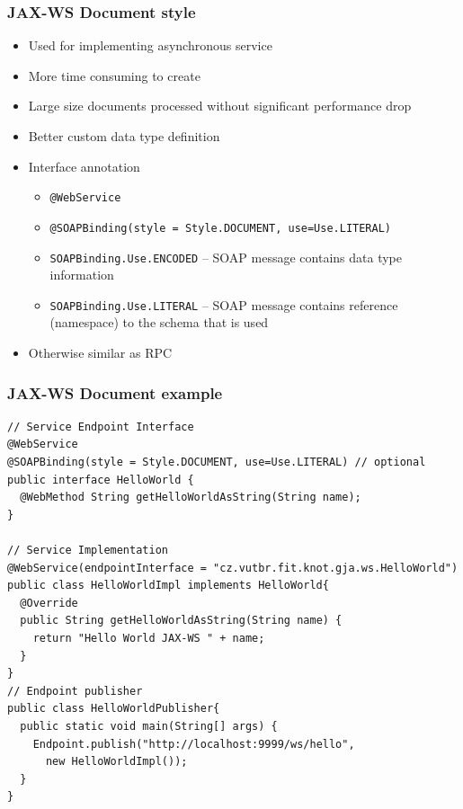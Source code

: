 \documentclass[10pt,xcolor=pdflatex]{beamer}
\begin{document}
\begin{frame}[containsverbatim]\frametitle{JAX-WS Document style}
\begin{itemize}
	\item Used for implementing asynchronous service
	\item More time consuming to create
	\item Large size documents processed without significant performance drop
	\item Better custom data type definition
	\item Interface annotation
      \begin{itemize}
    	\item \texttt{@WebService}
		\item {\footnotesize \texttt{@SOAPBinding(style = Style.DOCUMENT, use=Use.LITERAL)}}
		\item \texttt{SOAPBinding.Use.ENCODED} -- SOAP message contains data type information
		\item \texttt{SOAPBinding.Use.LITERAL} -- SOAP message contains reference (namespace) to the schema that is used
      \end{itemize}
    
    \item Otherwise similar as RPC
\end{itemize}
\end{frame}


\begin{frame}[containsverbatim]\frametitle{JAX-WS Document example}
\begin{footnotesize}
\begin{verbatim}
// Service Endpoint Interface
@WebService
@SOAPBinding(style = Style.DOCUMENT, use=Use.LITERAL) // optional
public interface HelloWorld {
  @WebMethod String getHelloWorldAsString(String name);
}

// Service Implementation
@WebService(endpointInterface = "cz.vutbr.fit.knot.gja.ws.HelloWorld")
public class HelloWorldImpl implements HelloWorld{
  @Override
  public String getHelloWorldAsString(String name) {
    return "Hello World JAX-WS " + name;
  }
}
// Endpoint publisher
public class HelloWorldPublisher{
  public static void main(String[] args) {
    Endpoint.publish("http://localhost:9999/ws/hello", 
      new HelloWorldImpl());
  }
}
\end{verbatim}
\end{footnotesize}
\end{frame}
\end{document}
